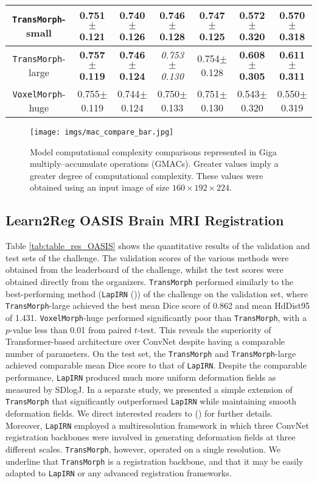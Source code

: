 \documentclass[times,twocolumn,final]{elsarticle}
\begin{document}
\begin{table*}[!t]
\begin{tabular}{ c || c | c | c | c | c | c }
 \hline
 \texttt{TransMorph}-small & 0.751$\pm$0.121 & 0.740$\pm$0.126  & 0.746$\pm$0.128 & 0.747$\pm$0.125 & 0.572$\pm$0.320 & 0.570$\pm$0.318\\
 \hline
 \texttt{TransMorph}-large & \textbf{0.757$\pm$0.119}& \textbf{0.746$\pm$0.124}  & \textit{0.753$\pm$0.130} & 0.754$\pm$0.128 & \textbf{0.608$\pm$0.305} & \textbf{0.611$\pm$0.311}\\
 \hline
 \texttt{VoxelMorph}-huge & 0.755$\pm$0.119& 0.744$\pm$0.124  & 0.750$\pm$0.133 & 0.751$\pm$0.130 & 0.543$\pm$0.320 &  0.550$\pm$0.319 \\
 \hline
\end{tabular}
\label{tab:table_ablation_sys}
\end{table*}

\begin{figure*}[!t]
\centering
\texttt{[image: imgs/mac\_compare\_bar.jpg]}
\caption{Model computational complexity comparisons represented in Giga multiply–accumulate operations (GMACs). Greater values imply a greater degree of computational complexity. These values were obtained using an input image of size $160\times 192\times 224$.  \label{fig:MACs_compare}}
\end{figure*}

\subsection{Learn2Reg OASIS Brain MRI Registration}
Table \ref{tab:table_res_OASIS} shows the quantitative results of the validation and test sets of the challenge. The validation scores of the various methods were obtained from the leaderboard of the challenge, whilst the test scores were obtained directly from the organizers. \texttt{TransMorph} performed similarly to the best-performing method (\texttt{LapIRN} (\cite{mok2021conditional})) of the challenge on the validation set, where \texttt{TransMorph}-large achieved the best mean Dice score of 0.862 and mean HdDist95 of 1.431. \texttt{VoxelMorph}-huge performed significantly poor than \texttt{TransMorph}, with a $p$-value less than 0.01 from paired $t$-test. This reveals the superiority of Transformer-based architecture over ConvNet despite having a comparable number of parameters. On the test set, the \texttt{TransMorph} and \texttt{TransMorph}-large achieved comparable mean Dice score to that of \texttt{LapIRN}. Despite the comparable performance, \texttt{LapIRN} produced much more uniform deformation fields as measured by SDlogJ. In a separate study, we presented a simple extension of \texttt{TransMorph} that significantly outperformed \texttt{LapIRN} while maintaining smooth deformation fields. We direct interested readers to (\cite{chen2022unsupervised}) for further details. Moreover, \texttt{LapIRN} employed a multiresolution framework in which three ConvNet registration backbones were involved in generating deformation fields at three different scales. \texttt{TransMorph}, however, operated on a single resolution. We underline that \texttt{TransMorph} is a registration backbone, and that it may be easily adapted to \texttt{LapIRN} or any advanced registration frameworks.
\end{document}
